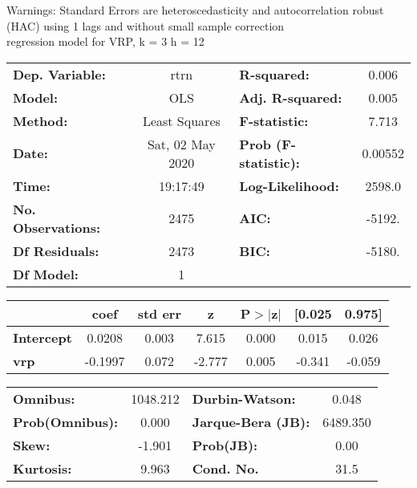 Warnings: \newline
 [1] Standard Errors are heteroscedasticity and autocorrelation robust (HAC) using 1 lags and without small sample correction\\ 

regression model for VRP, k = 3 h = 12\begin{center}
\begin{tabular}{lclc}
\toprule
\textbf{Dep. Variable:}    &       rtrn       & \textbf{  R-squared:         } &     0.006   \\
\textbf{Model:}            &       OLS        & \textbf{  Adj. R-squared:    } &     0.005   \\
\textbf{Method:}           &  Least Squares   & \textbf{  F-statistic:       } &     7.713   \\
\textbf{Date:}             & Sat, 02 May 2020 & \textbf{  Prob (F-statistic):} &  0.00552    \\
\textbf{Time:}             &     19:17:49     & \textbf{  Log-Likelihood:    } &    2598.0   \\
\textbf{No. Observations:} &        2475      & \textbf{  AIC:               } &    -5192.   \\
\textbf{Df Residuals:}     &        2473      & \textbf{  BIC:               } &    -5180.   \\
\textbf{Df Model:}         &           1      & \textbf{                     } &             \\
\bottomrule
\end{tabular}
\begin{tabular}{lcccccc}
                   & \textbf{coef} & \textbf{std err} & \textbf{z} & \textbf{P$> |$z$|$} & \textbf{[0.025} & \textbf{0.975]}  \\
\midrule
\textbf{Intercept} &       0.0208  &        0.003     &     7.615  &         0.000        &        0.015    &        0.026     \\
\textbf{vrp}       &      -0.1997  &        0.072     &    -2.777  &         0.005        &       -0.341    &       -0.059     \\
\bottomrule
\end{tabular}
\begin{tabular}{lclc}
\textbf{Omnibus:}       & 1048.212 & \textbf{  Durbin-Watson:     } &    0.048  \\
\textbf{Prob(Omnibus):} &   0.000  & \textbf{  Jarque-Bera (JB):  } & 6489.350  \\
\textbf{Skew:}          &  -1.901  & \textbf{  Prob(JB):          } &     0.00  \\
\textbf{Kurtosis:}      &   9.963  & \textbf{  Cond. No.          } &     31.5  \\
\bottomrule
\end{tabular}
\end{center}

